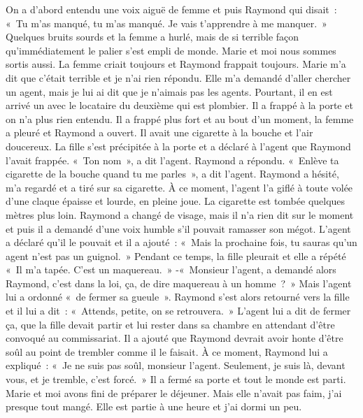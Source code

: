 \documentclass[french,twoside]{book} %
\begin{document}
On a d’abord entendu une voix aiguë de femme et puis Raymond qui disait : « Tu m’as manqué, tu m’as manqué. Je vais t’apprendre à me manquer. » Quelques bruits sourds et la femme a hurlé, mais de si terrible façon qu’immédiatement le palier s’est empli de monde. Marie et moi nous sommes sortis aussi. La femme criait toujours et Raymond frappait toujours. Marie m’a dit que c’était terrible et je n’ai rien répondu. Elle m’a demandé d’aller chercher un agent, mais je lui ai dit que je n’aimais pas les agents. Pourtant, il en est arrivé un avec le locataire du deuxième qui est plombier. Il a frappé à la porte et on n’a plus rien entendu. Il a frappé plus fort et au bout d’un moment, la femme a pleuré et Raymond a ouvert. Il avait une cigarette à la bouche et l’air doucereux. La fille s’est précipitée à la porte et a déclaré à l’agent que Raymond l’avait frappée. « Ton nom », a dit l’agent. Raymond a répondu. « Enlève ta cigarette de la bouche quand tu me parles », a dit l’agent. Raymond a hésité, m’a regardé et a tiré sur sa cigarette. À ce moment, l’agent l’a giflé à toute volée d’une claque épaisse et lourde, en pleine joue. La cigarette est tombée quelques mètres plus loin. Raymond a changé de visage, mais il n’a rien dit sur le moment et puis il a demandé d’une voix humble s’il pouvait ramasser son mégot. L'agent a déclaré qu’il le pouvait et il a ajouté : « Mais la prochaine fois, tu sauras qu’un agent n’est pas un guignol. » Pendant ce temps, la fille pleurait et elle a répété « Il m’a tapée. C'est un maquereau. » -« Monsieur l’agent, a demandé alors Raymond, c’est dans la loi, ça, de dire maquereau à un homme ? » Mais l’agent lui a ordonné « de fermer sa gueule ». Raymond s’est alors retourné vers la fille et il lui a dit : « Attends, petite, on se retrouvera. » L'agent lui a dit de fermer ça, que la fille devait partir et lui rester dans sa chambre en attendant d’être convoqué au commissariat. Il a ajouté que Raymond devrait avoir honte d’être soûl au point de trembler comme il le faisait. À ce moment, Raymond lui a expliqué : « Je ne suis pas soûl, monsieur l’agent. Seulement, je suis là, devant vous, et je tremble, c’est forcé. » Il a fermé sa porte et tout le monde est parti. Marie et moi avons fini de préparer le déjeuner. Mais elle n’avait pas faim, j’ai presque tout mangé. Elle est partie à une heure et j’ai dormi un peu.\par
\end{document}
